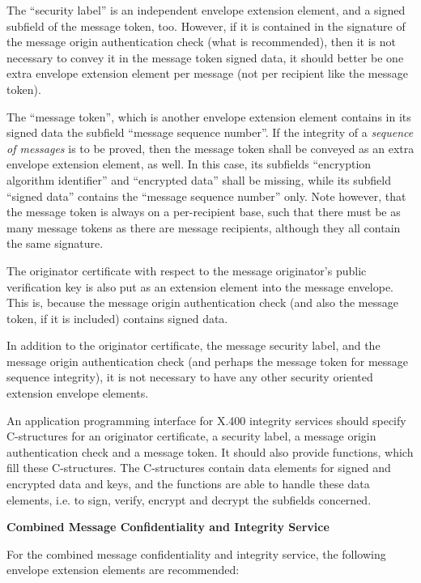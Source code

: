 The ``security label'' is an independent envelope extension element,
and a signed subfield of the message token, too.
However, if it is contained in the signature
of the message origin authentication check
(what is recommended), then
it is not necessary to convey it in the message token signed data,
it should better be one extra envelope extension element
per message (not per recipient like the message token).

The ``message token'', which is another envelope extension element
contains in its signed data
the subfield ``message sequence number''.
If the integrity of a {\em sequence of messages} is to be proved,
then the message token
shall be conveyed as an extra envelope extension element, as well.
In this case, its subfields ``encryption algorithm identifier''
and ``encrypted data'' shall be missing, while
its subfield ``signed data'' contains the ``message sequence number'' only.
Note however, that the message token is always on a per-recipient base,
such that there must be as many message tokens as there are
message recipients, although they all contain the same signature.

The originator certificate with respect to the message originator's
public verification key is also put as an
extension element into the message envelope.
This is, because the
message origin authentication check
(and also the message token, if it is included)
contains signed data.

In addition to the originator certificate,
the message security label,
and the message origin authentication check
(and perhaps the message token for message sequence integrity),
it is not necessary to have any other security oriented
extension envelope elements.

An application programming interface for X.400 integrity services
should specify C-structures for an originator certificate,
a security label,
a message origin authentication check and a message token.
It should also provide functions, which fill these C-structures.
The C-structures contain data elements for signed and encrypted data and keys,
and the functions are able to handle these data elements,
i.e. to sign, verify, encrypt and decrypt the subfields concerned.

{\bf Combined Message Confidentiality and Integrity Service}
\label{isw-mcis}

For the combined message confidentiality and integrity service,
the following envelope extension elements
are recommended:

